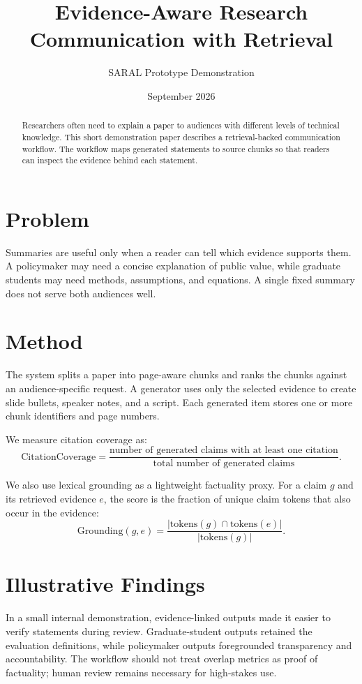 \documentclass[11pt]{article}
\title{Evidence-Aware Research Communication with Retrieval}
\author{SARAL Prototype Demonstration}
\date{September 2026}
\begin{document}
\maketitle

\begin{abstract}
Researchers often need to explain a paper to audiences with different levels of technical knowledge. This short demonstration paper describes a retrieval-backed communication workflow. The workflow maps generated statements to source chunks so that readers can inspect the evidence behind each statement.
\end{abstract}

\section{Problem}
Summaries are useful only when a reader can tell which evidence supports them. A policymaker may need a concise explanation of public value, while graduate students may need methods, assumptions, and equations. A single fixed summary does not serve both audiences well.

\section{Method}
The system splits a paper into page-aware chunks and ranks the chunks against an audience-specific request. A generator uses only the selected evidence to create slide bullets, speaker notes, and a script. Each generated item stores one or more chunk identifiers and page numbers.

We measure citation coverage as:
\[
\mathrm{CitationCoverage} =
\frac{\text{number of generated claims with at least one citation}}
{\text{total number of generated claims}}.
\]

We also use lexical grounding as a lightweight factuality proxy. For a claim $g$ and its retrieved evidence $e$, the score is the fraction of unique claim tokens that also occur in the evidence:
\[
\mathrm{Grounding}(g,e) = \frac{|\mathrm{tokens}(g) \cap \mathrm{tokens}(e)|}{|\mathrm{tokens}(g)|}.
\]

\section{Illustrative Findings}
In a small internal demonstration, evidence-linked outputs made it easier to verify statements during review. Graduate-student outputs retained the evaluation definitions, while policymaker outputs foregrounded transparency and accountability. The workflow should not treat overlap metrics as proof of factuality; human review remains necessary for high-stakes use.
\end{document}
